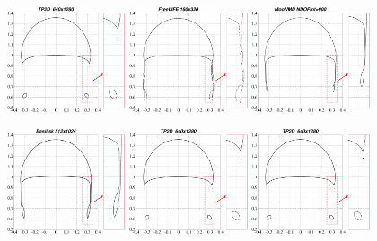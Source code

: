 \documentclass[review]{elsarticle}
\begin{document}
\begin{figure}[!h]
\begin{center}
 \vspace{-1mm}
 \includegraphics[width=0.31\textwidth]{figures/bubble_shape_t=3_TP2D.pdf}
 \hspace{2mm}
 \includegraphics[width=0.31\textwidth]{figures/bubble_shape_t=3_FreeLIFE.pdf}
 \hspace{2mm}
 \includegraphics[width=0.31\textwidth]{figures/bubble_shape_t=3_MoonNMD.pdf}
 
 \vspace{2mm}
 \includegraphics[width=0.31\textwidth]{figures/bubble_shape_t=3_Basilisk.pdf}
 \hspace{2mm}
 \includegraphics[width=0.31\textwidth]{figures/bubble_shape_t=3_TP2D.pdf}
 \hspace{2mm}
 \includegraphics[width=0.31\textwidth]{figures/bubble_shape_t=3_TP2D.pdf}
 

\end{center}
\end{figure}
\end{document}
